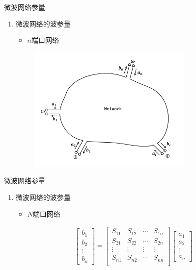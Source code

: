 \begin{frame}{微波网络参量}
    \begin{enumerate}
        \resume
        \item 微波网络的波参量\\
        \begin{itemize}
            \item $n$端口网络
        \end{itemize}
        \begin{figure}
            \includegraphics[width=8cm]{Cha5//fig5-13.pdf}
        \end{figure}
    \end{enumerate}
\end{frame}

\begin{frame}{微波网络参量}
    \begin{enumerate}
        \resume
        \item 微波网络的波参量 \\
        \begin{itemize}
            \item $N$端口网络
        \end{itemize}
        \begin{gather*}
            \begin{bmatrix*}
                b_1 \\
                b_2 \\
                \vdots \\
                b_n
            \end{bmatrix*}=
            \begin{bmatrix*}
                S_{11} & S_{12} & \cdots & S_{1n} \\
                S_{21} & S_{22} & \cdots & S_{2n} \\
                \vdots & \vdots & \vdots & \vdots \\
                S_{n1} & S_{n2} & \cdots & S_{nn} \\
            \end{bmatrix*}
            \begin{bmatrix*}
                a_1 \\
                a_2 \\
                \vdots \\
                a_n
            \end{bmatrix*}
        \end{gather*}
    \end{enumerate}
\end{frame}

